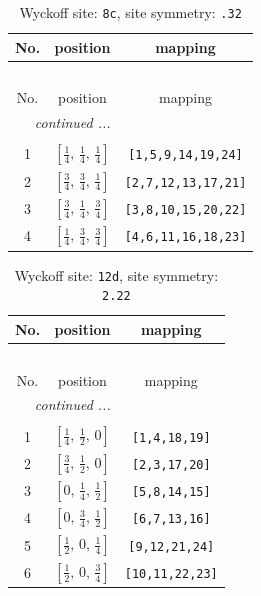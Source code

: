 \documentclass[fleqn,8pt]{jsarticle}
\begin{document}
\renewcommand{\arraystretch}{1.2}
\begin{longtable}{ccc}
\caption{Wyckoff site: {\tt 8c}, site symmetry: {\tt .32}}
 \\
 \hline \hline
No. & position & mapping \\ \hline \endfirsthead

\multicolumn{2}{l}{\tablename\ \thetable{}} \\
 \hline \hline
No. & position & mapping \\ \hline \endhead

 \hline \hline
\multicolumn{2}{r}{\footnotesize\it continued ...} \\ \endfoot

 \hline \hline
\multicolumn{2}{r}{} \\ \endlastfoot

1 & $\left[ \frac{1}{4},\, \frac{1}{4},\, \frac{1}{4} \right]$ & {\tt [1,5,9,14,19,24]} \\ \hline
2 & $\left[ \frac{3}{4},\, \frac{3}{4},\, \frac{1}{4} \right]$ & {\tt [2,7,12,13,17,21]} \\ \hline
3 & $\left[ \frac{3}{4},\, \frac{1}{4},\, \frac{3}{4} \right]$ & {\tt [3,8,10,15,20,22]} \\ \hline
4 & $\left[ \frac{1}{4},\, \frac{3}{4},\, \frac{3}{4} \right]$ & {\tt [4,6,11,16,18,23]} \\
\end{longtable}
\renewcommand{\arraystretch}{1.2}
\begin{longtable}{ccc}
\caption{Wyckoff site: {\tt 12d}, site symmetry: {\tt 2.22}}
 \\
 \hline \hline
No. & position & mapping \\ \hline \endfirsthead

\multicolumn{2}{l}{\tablename\ \thetable{}} \\
 \hline \hline
No. & position & mapping \\ \hline \endhead

 \hline \hline
\multicolumn{2}{r}{\footnotesize\it continued ...} \\ \endfoot

 \hline \hline
\multicolumn{2}{r}{} \\ \endlastfoot

1 & $\left[ \frac{1}{4},\, \frac{1}{2},\, 0 \right]$ & {\tt [1,4,18,19]} \\ \hline
2 & $\left[ \frac{3}{4},\, \frac{1}{2},\, 0 \right]$ & {\tt [2,3,17,20]} \\ \hline
3 & $\left[ 0,\, \frac{1}{4},\, \frac{1}{2} \right]$ & {\tt [5,8,14,15]} \\ \hline
4 & $\left[ 0,\, \frac{3}{4},\, \frac{1}{2} \right]$ & {\tt [6,7,13,16]} \\ \hline
5 & $\left[ \frac{1}{2},\, 0,\, \frac{1}{4} \right]$ & {\tt [9,12,21,24]} \\ \hline
6 & $\left[ \frac{1}{2},\, 0,\, \frac{3}{4} \right]$ & {\tt [10,11,22,23]} \\
\end{longtable}
\end{document}
